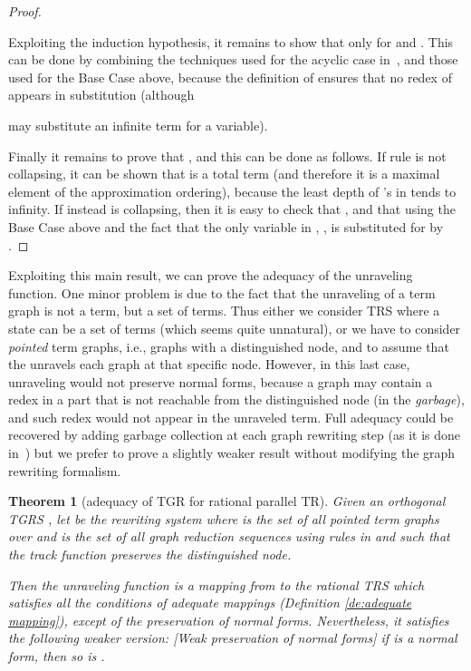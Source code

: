 \documentclass{eptcs}
\theoremstyle{plain}
\newtheorem{theorem}{Theorem} \newtheorem{lemma}[theorem]{Lemma}
\theoremstyle{definition}
\begin{document}
\begin{proof}
\begin{description}
\noindent
Exploiting the induction hypothesis, it remains to show that 
 only for  and . This can be done by combining the techniques 
used for the acyclic case in~\cite{HP:ITRJ,CR:HRJR}, and those used for the 
Base Case above, because the definition of  ensures 
that no redex of  appears in substitution  (although 
 
may substitute an infinite term for a variable).

\end{description}

\noindent 
Finally it remains to prove that , and this can be done as follows. If rule 
 is not collapsing, it can be shown that  is a total term (and therefore it is a maximal element of the
approximation ordering), because the least depth of 's in  
tends to infinity. If instead  is collapsing, then it is easy to 
check that , and 
that  using the Base Case above and the 
fact that the only variable in , , is 
substituted for  by . 
\end{proof}

Exploiting this main result, we can prove the adequacy of the 
unraveling function. One minor problem is due to the fact that the 
unraveling of a term graph is not a term, but a set of terms. Thus 
either we consider TRS where a state can be a set of terms (which 
seems quite unnatural), or we have to consider {\em pointed} term 
graphs, i.e., graphs with a distinguished node, and to assume that the 
 unravels each graph at that specific node. However, in this 
last case, unraveling would not preserve normal forms, because a graph 
may contain a redex in a part that is not reachable from the 
distinguished node (in the {\em garbage}), and such redex would not 
appear in the unraveled term. Full adequacy could be recovered by 
adding garbage collection at each graph rewriting step (as it is done 
in~\cite{BEGKPS:TGR,KKSV:AGRS}) but we prefer to prove a 
slightly weaker result without modifying the graph rewriting formalism.


\begin{theorem} 
[adequacy of TGR for rational parallel TR]
\label{th:adequacy}
Given an orthogonal TGRS , let  be the rewriting system where  is the set of 
all pointed term graphs over  and  is the 
set of all graph reduction sequences using rules in  and 
such that the track function preserves the distinguished node. 

Then the unraveling function  is a mapping from   to the rational TRS   which satisfies all 
the conditions of adequate mappings (Definition \ref{de:adequate 
mapping}), except of the preservation of normal forms. Nevertheless, 
it satisfies the following weaker version: {\em [Weak preservation of 
normal forms]} if  is a normal form, then so is .    

\end{theorem}
\end{document}

